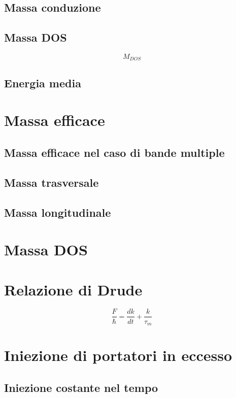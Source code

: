 \documentclass[10pt,a4paper]{report}
\begin{document}
	\section{Massa conduzione}

	\section{Massa DOS}
	\begin{equation}
	M_{DOS}
	\end{equation}

	
	\section{Energia media}

\chapter{Massa efficace}

	\section{Massa efficace nel caso di bande multiple}

	\section{Massa trasversale}

	\section{Massa longitudinale}

\chapter{Massa DOS}

\chapter{Relazione di Drude}

\[
\frac{\textit{F}}{\hslash}=\frac{dk}{dt}+\frac{k}{\tau_m}
\]

\chapter{Iniezione di portatori in eccesso}

	\section{Iniezione costante nel tempo}
\end{document}
